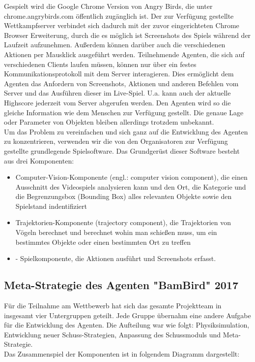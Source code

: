 Gespielt wird die Google Chrome Version von Angry Birds, die unter chrome.angrybirds.com öffentlich zugänglich ist. Der zur Verfügung gestellte Wettkampfserver verbindet sich dadurch mit der zuvor eingerichteten Chrome Browser Erweiterung, durch die es möglich ist Screenshots des Spiels während der Laufzeit aufzunehmen. Außerdem können darüber auch die verschiedenen Aktionen per Mausklick ausgeführt werden. Teilnehmende Agenten, die sich auf verschiedenen Clients laufen müssen, können nur über ein festes Kommunikationsprotokoll mit dem Server interagieren. Dies ermöglicht dem Agenten das Anfordern von Screenshots, Aktionen und anderen Befehlen vom Server und das Ausführen dieser im Live-Spiel. U.a. kann auch der aktuelle Highscore jederzeit vom Server abgerufen werden. Den Agenten wird so die gleiche Information wie dem Menschen zur Verfügung gestellt. Die genaue Lage oder Parameter von Objekten bleiben allerdings trotzdem unbekannt.\\
Um das Problem zu vereinfachen und sich ganz auf die Entwicklung des Agenten zu konzentrieren, verwenden wir die von den Organisatoren zur Verfügung gestellte grundlegende Spielsoftware. Das Grundgerüst dieser Software besteht aus drei Komponenten:

\begin{itemize}
\item Computer-Vision-Komponente (engl.: computer vision component), die einen Ausschnitt des Videospiels analysieren kann und den Ort, die Kategorie und die Begrenzungsbox (Bounding Box) alles relevanten Objekte sowie den Spielstand indentifiziert
\item Trajektorien-Komponente (trajectory component), die Trajektorien von Vögeln berechnet und berechnet wohin man schießen muss, um ein bestimmtes Objekte oder einen bestimmten Ort zu treffen
\item -	Spielkomponente, die Aktionen ausführt und Screenshots erfasst.
\end{itemize}

\subsection{Meta-Strategie des Agenten "BamBird" 2017}
Für die Teilnahme am Wettbewerb hat sich das gesamte Projektteam in insgesamt vier Untergruppen geteilt. Jede Gruppe übernahm eine andere Aufgabe für die Entwicklung des Agenten. Die Aufteilung war wie folgt: Physiksimulation, Entwicklung neuer Schuss-Strategien, Anpassung des Schussmoduls und Meta-Strategie.\\
Das Zusammenspiel der Komponenten ist in folgendem Diagramm dargestellt:

